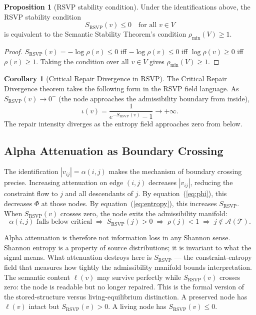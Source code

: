 \documentclass[11pt, a4paper]{article}
\theoremstyle{definition}
\newtheorem{proposition}{Proposition}
\newtheorem{corollary}{Corollary}
\theoremstyle{remark}
\begin{document}
\begin{proposition}[RSVP stability condition]
Under the identifications above, the RSVP stability condition
\[
S_{\mathrm{RSVP}}(v) \leq 0 \quad \text{for all } v \in V
\]
is equivalent to the Semantic Stability Theorem's condition
$\rho_{\min}(V) \geq 1$.
\end{proposition}

\begin{proof}
$S_{\mathrm{RSVP}}(v) = -\log\rho(v) \leq 0$ iff $-\log\rho(v) \leq 0$ iff
$\log\rho(v) \geq 0$ iff $\rho(v) \geq 1$.
Taking the condition over all $v \in V$ gives $\rho_{\min}(V) \geq 1$.
\end{proof}

\begin{corollary}[Critical Repair Divergence in RSVP]
The Critical Repair Divergence theorem takes the following form in the RSVP
field language. As $S_{\mathrm{RSVP}}(v) \to 0^-$ (the node approaches the
admissibility boundary from inside),
\[
\iota(v) = \frac{1}{e^{-S_{\mathrm{RSVP}}(v)} - 1} \to +\infty.
\]
The repair intensity diverges as the entropy field approaches zero from below.
\end{corollary}

\subsection{Alpha Attenuation as Boundary Crossing}

The identification $|v_{ij}| = \alpha(i,j)$ makes the mechanism of boundary
crossing precise. Increasing attenuation on edge $(i,j)$ decreases $|v_{ij}|$,
reducing the constraint flow to $j$ and all descendants of $j$. By
equation~(\ref{eq:phi}), this decreases $\Phi$ at those nodes. By
equation~(\ref{eq:entropy}), this increases $S_{\mathrm{RSVP}}$. When
$S_{\mathrm{RSVP}}(v)$ crosses zero, the node exits the admissibility manifold:
\[
\alpha(i,j) \text{ falls below critical}
\;\Rightarrow\; S_{\mathrm{RSVP}}(j) > 0
\;\Rightarrow\; \rho(j) < 1
\;\Rightarrow\; j \notin \mathcal{A}(\mathcal{T}).
\]

Alpha attenuation is therefore not information loss in any Shannon sense.
Shannon entropy is a property of source distributions; it is invariant to
what the signal means. What attenuation destroys here is $S_{\mathrm{RSVP}}$
--- the constraint-entropy field that measures how tightly the admissibility
manifold bounds interpretation. The semantic content $\ell(v)$ may survive
perfectly while $S_{\mathrm{RSVP}}(v)$ crosses zero: the node is readable
but no longer repaired. This is the formal version of the stored-structure
versus living-equilibrium distinction. A preserved node has $\ell(v)$ intact
but $S_{\mathrm{RSVP}}(v) > 0$. A living node has $S_{\mathrm{RSVP}}(v) \leq 0$.
\end{document}
